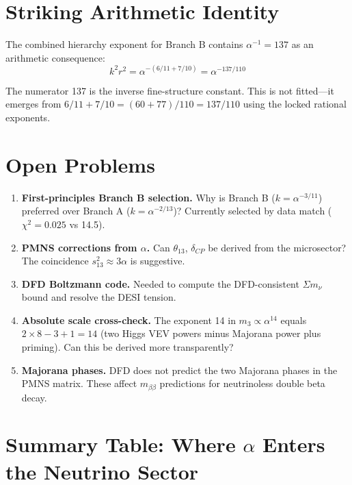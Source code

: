\documentclass[11pt,a4paper]{article}
\begin{document}
\section{Striking Arithmetic Identity}

The combined hierarchy exponent for Branch B contains $\alpha^{-1} = 137$
as an arithmetic consequence:
\begin{equation}
k^2 r^2 = \alpha^{-(6/11 + 7/10)} = \alpha^{-137/110}
\end{equation}

The numerator 137 is the inverse fine-structure constant. This is not
fitted---it emerges from $6/11 + 7/10 = (60 + 77)/110 = 137/110$ using
the locked rational exponents.

\section{Open Problems}

\begin{enumerate}
\item \textbf{First-principles Branch B selection.} Why is Branch B
  ($k = \alpha^{-3/11}$) preferred over Branch A ($k = \alpha^{-2/13}$)?
  Currently selected by data match ($\chi^2 = 0.025$ vs 14.5).

\item \textbf{PMNS corrections from $\alpha$.} Can $\theta_{13}$,
  $\delta_{CP}$ be derived from the microsector? The coincidence
  $s_{13}^2 \approx 3\alpha$ is suggestive.

\item \textbf{DFD Boltzmann code.} Needed to compute the DFD-consistent
  $\Sigma m_\nu$ bound and resolve the DESI tension.

\item \textbf{Absolute scale cross-check.} The exponent 14 in
  $m_3 \propto \alpha^{14}$ equals $2 \times 8 - 3 + 1 = 14$ (two
  Higgs VEV powers minus Majorana power plus priming). Can this be
  derived more transparently?

\item \textbf{Majorana phases.} DFD does not predict the two Majorana
  phases in the PMNS matrix. These affect $m_{\beta\beta}$ predictions
  for neutrinoless double beta decay.
\end{enumerate}


\section*{Summary Table: Where $\alpha$ Enters the Neutrino Sector}
\end{document}
